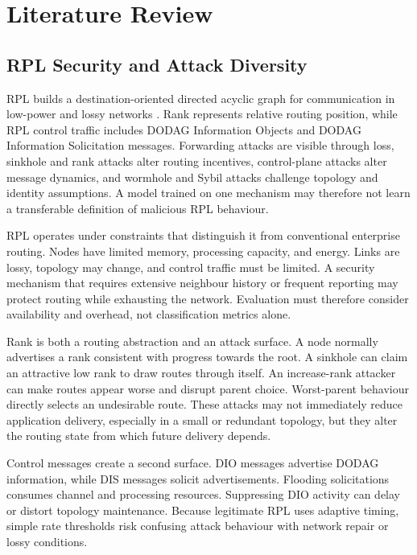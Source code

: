 \chapter{Literature Review}
\label{chap:literature}

\section{RPL Security and Attack Diversity}

RPL builds a destination-oriented directed acyclic graph for communication in low-power and lossy networks \cite{rpl6550}. Rank represents relative routing position, while RPL control traffic includes DODAG Information Objects and DODAG Information Solicitation messages. Forwarding attacks are visible through loss, sinkhole and rank attacks alter routing incentives, control-plane attacks alter message dynamics, and wormhole and Sybil attacks challenge topology and identity assumptions. A model trained on one mechanism may therefore not learn a transferable definition of malicious RPL behaviour.

RPL operates under constraints that distinguish it from conventional enterprise routing. Nodes have limited memory, processing capacity, and energy. Links are lossy, topology may change, and control traffic must be limited. A security mechanism that requires extensive neighbour history or frequent reporting may protect routing while exhausting the network. Evaluation must therefore consider availability and overhead, not classification metrics alone.

Rank is both a routing abstraction and an attack surface. A node normally advertises a rank consistent with progress towards the root. A sinkhole can claim an attractive low rank to draw routes through itself. An increase-rank attacker can make routes appear worse and disrupt parent choice. Worst-parent behaviour directly selects an undesirable route. These attacks may not immediately reduce application delivery, especially in a small or redundant topology, but they alter the routing state from which future delivery depends.

Control messages create a second surface. DIO messages advertise DODAG information, while DIS messages solicit advertisements. Flooding solicitations consumes channel and processing resources. Suppressing DIO activity can delay or distort topology maintenance. Because legitimate RPL uses adaptive timing, simple rate thresholds risk confusing attack behaviour with network repair or lossy conditions.

